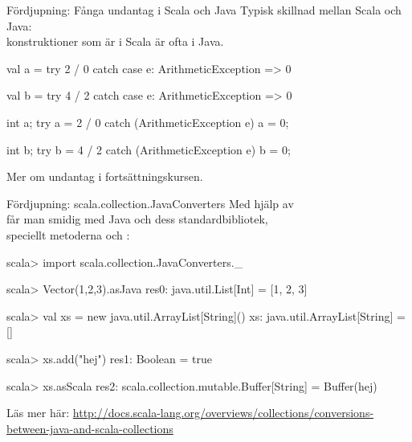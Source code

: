 \begin{Slide}{Fördjupning: Fånga undantag i Scala och Java}
Typisk skillnad mellan Scala och Java:\\konstruktioner som är  i Scala är ofta  i Java.
\begin{multicols}{2}
\begin{CodeSmall}[basicstyle=\ttfamily\SlideFontSize{6}{8}]
val a = try { 2 / 0 } catch { 
  case e: ArithmeticException => 0 
}

val b = try { 4 / 2 } catch { 
  case e: ArithmeticException => 0 
}
\end{CodeSmall}

\columnbreak

\begin{CodeSmall}[language=Java,basicstyle=\ttfamily\SlideFontSize{6}{8}]
int a;
try {
    a = 2 / 0
} catch (ArithmeticException e) {
    a = 0;
}

int b;
try {
    b = 4 / 2
} catch (ArithmeticException e) {
    b = 0;
}

\end{CodeSmall}
\end{multicols}

Mer om undantag  i fortsättningskursen.
\end{Slide}



\begin{Slide}{Fördjupning: scala.collection.JavaConverters}\SlideFontSmall
Med hjälp av  \\
får man smidig  med Java och dess standardbibliotek, \\ 
speciellt metoderna  och :
\begin{REPL}
scala> import scala.collection.JavaConverters._

scala> Vector(1,2,3).asJava
res0: java.util.List[Int] = [1, 2, 3]

scala> val xs = new java.util.ArrayList[String]()
xs: java.util.ArrayList[String] = []

scala> xs.add("hej")
res1: Boolean = true

scala> xs.asScala
res2: scala.collection.mutable.Buffer[String] = Buffer(hej)
\end{REPL}

Läs mer här: \url{http://docs.scala-lang.org/overviews/collections/conversions-between-java-and-scala-collections}

\end{Slide}

